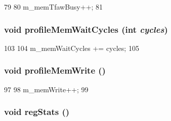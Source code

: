 \begin{DoxyCode}
79 {
80     m_memTfawBusy++;
81 }
\end{DoxyCode}
\hypertarget{classMemCntrlProfiler_a1016c2b56b2e6a85e6aba27ec4f574a0}{
\subsubsection[{profileMemWaitCycles}]{\setlength{\rightskip}{0pt plus 5cm}void profileMemWaitCycles (int {\em cycles})}}
\label{classMemCntrlProfiler_a1016c2b56b2e6a85e6aba27ec4f574a0}



\begin{DoxyCode}
103 {
104     m_memWaitCycles += cycles;
105 }
\end{DoxyCode}
\hypertarget{classMemCntrlProfiler_ad3a0650ce42e756305da022e6b226051}{
\subsubsection[{profileMemWrite}]{\setlength{\rightskip}{0pt plus 5cm}void profileMemWrite ()}}
\label{classMemCntrlProfiler_ad3a0650ce42e756305da022e6b226051}



\begin{DoxyCode}
97 {
98     m_memWrite++;
99 }
\end{DoxyCode}
\hypertarget{classMemCntrlProfiler_a4dc637449366fcdfc4e764cdf12d9b11}{
\subsubsection[{regStats}]{\setlength{\rightskip}{0pt plus 5cm}void regStats ()}}
\label{classMemCntrlProfiler_a4dc637449366fcdfc4e764cdf12d9b11}



